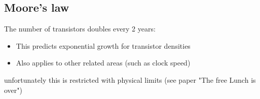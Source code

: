 \subsection{Moore's law}
The number of transistors doubles every 2 years:
\begin{itemize}
	\item This predicts exponential growth for transistor densities
	\item Also applies to other related areas (such as clock speed)
\end{itemize}
unfortunately this is restricted with physical limits (see paper "The free Lunch is over")


